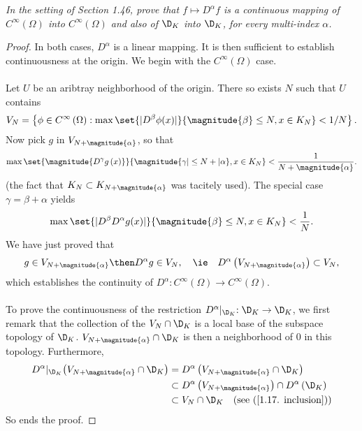 \textit{In the setting of Section 1.46, prove that 
    $f \mapsto D^{\alpha}f$ 
is a continuous mapping of 
%
  $C^{\infty}\left(\Omega\right)$ into 
  $C^{\infty}\left(\Omega\right)$ and also of 
  $\D_{K}$ into 
  $\D_{K}$, for every multi-index $\alpha$.
%
}
\begin{proof} 
In both cases, $D^\alpha$ is a linear mapping. 
It is then sufficient to establish continuousness at the origin.
%
We begin with the $C^\infty\left(\Omega\right)$ case. \\
\\
Let $U$ be an aribtray neighborhood of the origin.
There so exists $N$ such that $U$ contains
%
  \begin{align} 
    V_{N}= \left\{
      \phi \in C^\infty\left(\Omega\right): 
      \max\set{
        | D^\beta\phi (x) |
      }{
        \magnitude{ \beta } \leq N, x\in K_N
      }
    < 1/N
    \right\}.
  \end{align}
%
Now pick $g$ in $V_{N+\magnitude{\alpha}}$, so that
%
  \begin{align}
    \max
    \set{
      \magnitude{ D^\gamma g\left(x\right) }
    }{
      \magnitude{ \gamma | \leq N+| \alpha }, 
      x\in K_{N}
    }
    < \frac{1}{N+\magnitude{\alpha}}.
  \end{align}
%
(the fact that $K_N\subset K_{N+\magnitude{\alpha}}$ was tacitely used).
%
The special case $\gamma = \beta + \alpha$ yields
\begin{align}
    \max
    \set{
      | D^\beta D^\alpha g(x)|
    }{
      \magnitude{\beta} \leq N, 
      x\in K_{N}
    }
    < \frac{1}{N}.
  \end{align}
%
We have just proved that
%
  \begin{align}\label{1.17. inclusion}
    g \in V_{N + \magnitude{\alpha}}
      \then 
    D^\alpha g \in V_{N},
      \quad
      \ie
      \quad
    D^\alpha \left(V_{N+\magnitude{\alpha}}\right) \subset V_N,
  \end{align}
%
which establishes the continuity of %
%
  $D^{\alpha}: C^\infty \left(\Omega\right)\to C^\infty \left(\Omega\right)$. %
%
\\\\
To prove the continuousness of the restriction 
%
  $D^\alpha \lvert_{\D_K}: \D_K \to \D_K$, %
%
%
we first remark that the collection of the  
%
  ${V_N \cap \D_K}$ %
%
is a local base of the subspace topology of $\D_K$.
%
%
  $V_{N+\magnitude{\alpha}} \cap \D_K$ %
%
is then a neighborhood of $0$ in this topology. %
Furthermore, 
%
  \begin{align}
    D^\alpha \lvert_{\D_K} \left(V_{N+\magnitude{\alpha}} \cap \D_K\right) 
    & = 
      D^\alpha\left(V_{N+\magnitude{\alpha}} \cap \D_K\right) \\
    & \subset
      D^\alpha\left(V_{N+\magnitude{\alpha}}\right) 
        \cap 
      D^\alpha\left(\D_K\right) \\
    & \subset 
      V_N 
        \cap 
      \D_K
          \quad (\text{see }(\ref{1.17. inclusion}))
  \end{align}
%
So ends the proof.
\end{proof}
